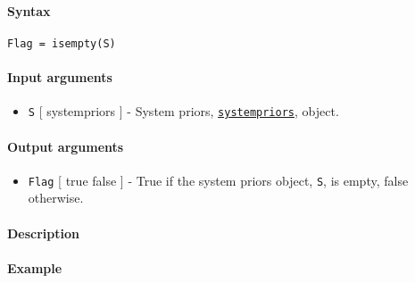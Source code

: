 


	\paragraph{Syntax}\label{syntax}

\begin{verbatim}
Flag = isempty(S)
\end{verbatim}

\paragraph{Input arguments}\label{input-arguments}

\begin{itemize}
\itemsep1pt\parskip0pt
\item
  \texttt{S} {[} systempriors {]} - System priors,
  \href{systempriors/Contents}{\texttt{systempriors}}, object.
\end{itemize}

\paragraph{Output arguments}\label{output-arguments}

\begin{itemize}
\itemsep1pt\parskip0pt
\item
  \texttt{Flag} {[} true \textbar{} false {]} - True if the system
  priors object, \texttt{S}, is empty, false otherwise.
\end{itemize}

\paragraph{Description}\label{description}

\paragraph{Example}\label{example}



